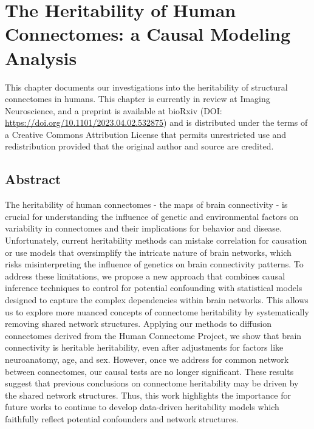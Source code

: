 \chapter[The Heritability of Human Connectomes]{The Heritability of Human Connectomes: a Causal Modeling Analysis} \label{chap:heritability}

This chapter documents our investigations into the heritability of structural connectomes in humans. %
This chapter is currently in review at Imaging Neuroscience, and a preprint is available at bioRxiv (DOI: \url{https://doi.org/10.1101/2023.04.02.532875}) and is distributed under the terms of a Creative Commons Attribution License that permits unrestricted use and redistribution provided that the original author and source are credited.

\begin{singlespace}         %
     
\end{singlespace} 

\pagebreak
\section*{Abstract}
The heritability of human connectomes - the maps of brain connectivity - is crucial for understanding the influence of genetic and environmental factors on variability in connectomes and their implications for behavior and disease. Unfortunately, current heritability methods can mistake correlation for causation or use models that oversimplify the intricate nature of brain networks, which risks misinterpreting the influence of genetics on brain connectivity patterns. To address these limitations, we propose a new approach that combines causal inference techniques to control for potential confounding with statistical models designed to capture the complex dependencies within brain networks. This allows us to explore more nuanced concepts of connectome heritability by systematically removing shared network structures. Applying our methods to diffusion connectomes derived from the Human Connectome Project, we show that brain connectivity is heritable heritability, even after adjustments for factors like neuroanatomy, age, and sex. However, once we address for common network between connectomes, our causal tests are no longer significant. These results suggest that previous conclusions on connectome heritability may be driven by the shared network structures. Thus, this work highlights the importance for future works to continue to develop data-driven heritability models which faithfully reflect potential confounders and network structures.
\pagebreak







